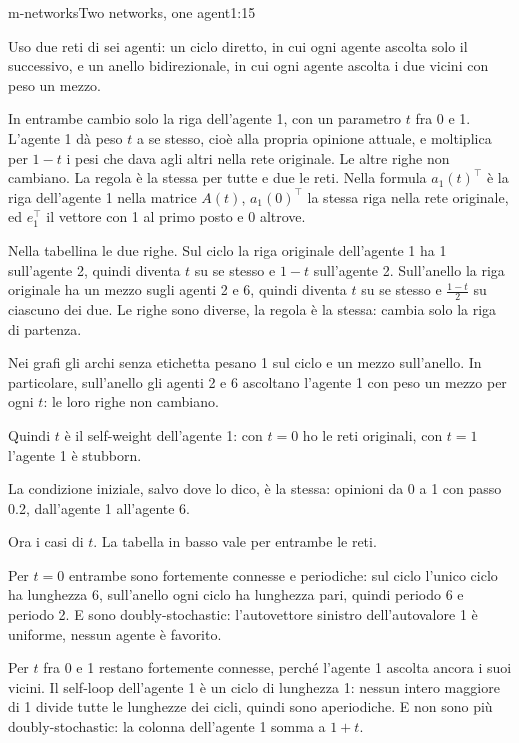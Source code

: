 \begin{slidedue}{m-networks}{Two networks, one agent}{1:15}
  \begin{discorso}
    \item Uso due reti di sei agenti: un ciclo diretto, in cui ogni agente ascolta solo il successivo, e un anello bidirezionale, in cui ogni agente ascolta i due vicini con peso un mezzo.
    \item In entrambe cambio solo la riga dell'agente 1, con un parametro $t$ fra 0 e 1. L'agente 1 dà peso $t$ a se stesso, cioè alla propria opinione attuale, e moltiplica per $1-t$ i pesi che dava agli altri nella rete originale. Le altre righe non cambiano. La regola è la stessa per tutte e due le reti. Nella formula $a_1(t)^\top$ è la riga dell'agente 1 nella matrice $A(t)$, $a_1(0)^\top$ la stessa riga nella rete originale, ed $e_1^\top$ il vettore con 1 al primo posto e 0 altrove.
    \item Nella tabellina le due righe. Sul ciclo la riga originale dell'agente 1 ha 1 sull'agente 2, quindi diventa $t$ su se stesso e $1-t$ sull'agente 2. Sull'anello la riga originale ha un mezzo sugli agenti 2 e 6, quindi diventa $t$ su se stesso e $\frac{1-t}{2}$ su ciascuno dei due. Le righe sono diverse, la regola è la stessa: cambia solo la riga di partenza.
    \item Nei grafi gli archi senza etichetta pesano 1 sul ciclo e un mezzo sull'anello. In particolare, sull'anello gli agenti 2 e 6 ascoltano l'agente 1 con peso un mezzo per ogni $t$: le loro righe non cambiano.
    \item Quindi $t$ è il self-weight dell'agente 1: con $t=0$ ho le reti originali, con $t=1$ l'agente 1 è stubborn.
    \item La condizione iniziale, salvo dove lo dico, è la stessa: opinioni da 0 a 1 con passo 0.2, dall'agente 1 all'agente 6.
    \item \clic Ora i casi di $t$. La tabella in basso vale per entrambe le reti.
    \item Per $t=0$ entrambe sono fortemente connesse e periodiche: sul ciclo l'unico ciclo ha lunghezza 6, sull'anello ogni ciclo ha lunghezza pari, quindi periodo 6 e periodo 2. E sono doubly-stochastic: l'autovettore sinistro dell'autovalore 1 è uniforme, nessun agente è favorito.
    \item Per $t$ fra 0 e 1 restano fortemente connesse, perché l'agente 1 ascolta ancora i suoi vicini. Il self-loop dell'agente 1 è un ciclo di lunghezza 1: nessun intero maggiore di 1 divide tutte le lunghezze dei cicli, quindi sono aperiodiche. E non sono più doubly-stochastic: la colonna dell'agente 1 somma a $1+t$.

\end{discorso}
\end{slidedue}
